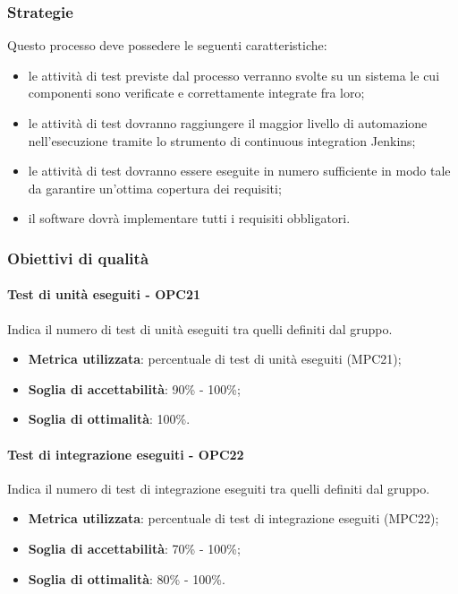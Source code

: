 \documentclass[PianoDiQualifica.tex]{subfiles}
\begin{document}
		\subsubsection{Strategie}
			Questo processo deve possedere le seguenti caratteristiche:
			\begin{itemize}
				\item le attività di test previste dal processo verranno svolte su un sistema le cui componenti sono verificate e correttamente integrate fra loro;
				\item le attività di test dovranno raggiungere il maggior livello di automazione nell'esecuzione tramite lo strumento di continuous integration Jenkins;
				\item le attività di test dovranno essere eseguite in numero sufficiente in modo tale da garantire un'ottima copertura dei requisiti;
				\item il software dovrà implementare tutti i requisiti obbligatori. 
			\end{itemize}
		
		\subsubsection{Obiettivi di qualità}
			\paragraph{Test di unità eseguiti - OPC21}
				Indica il numero di test di unità eseguiti tra quelli definiti dal gruppo.
				\begin{itemize}
					\item \textbf{Metrica utilizzata}: percentuale di test di unità eseguiti (MPC21);
					\item \textbf{Soglia di accettabilità}: 90\% - 100\%;
					\item \textbf{Soglia di ottimalità}: 100\%.
				\end{itemize}
			
			\paragraph{Test di integrazione eseguiti - OPC22}
				Indica il numero di test di integrazione eseguiti tra quelli definiti dal gruppo.
				\begin{itemize}
					\item \textbf{Metrica utilizzata}: percentuale di test di integrazione eseguiti (MPC22);
					\item \textbf{Soglia di accettabilità}: 70\% - 100\%;
					\item \textbf{Soglia di ottimalità}: 80\% - 100\%.
				\end{itemize}
				
\end{document}

